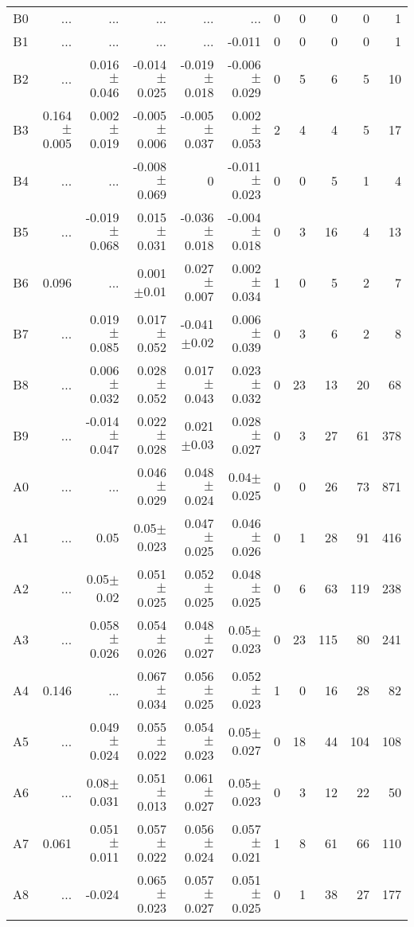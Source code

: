 \begin{table}[t]
\begin{table}[t]
\begin{center}
\begin{tabular}{c|rrrrr|rrrrr}
    B0	&	 ...	&	 ...	&	 ...	&	 ...	&	 ...	&	0	&	0	&	0	&	0	&	1	\\
    B1	&	 ...	&	 ...	&	 ...	&	 ...	&	-0.011	&	0	&	0	&	0	&	0	&	1	\\
    B2	&	 ...	&	0.016$\pm$0.046	&	-0.014$\pm$0.025	&	-0.019$\pm$0.018	&	-0.006$\pm$0.029	&	0	&	5	&	6	&	5	&	10	\\
    B3	&	0.164$\pm$0.005	&	0.002$\pm$0.019	&	-0.005$\pm$0.006	&	-0.005$\pm$0.037	&	0.002$\pm$0.053	&	2	&	4	&	4	&	5	&	17	\\
    B4	&	 ...	&	 ...	&	-0.008$\pm$0.069	&	0	&	-0.011$\pm$0.023	&	0	&	0	&	5	&	1	&	4	\\
    B5	&	 ...	&	-0.019$\pm$0.068	&	0.015$\pm$0.031	&	-0.036$\pm$0.018	&	-0.004$\pm$0.018	&	0	&	3	&	16	&	4	&	13	\\
    B6	&	0.096	&	 ...	&	0.001$\pm$0.01	&	0.027$\pm$0.007	&	0.002$\pm$0.034	&	1	&	0	&	5	&	2	&	7	\\
    B7	&	 ...	&	0.019$\pm$0.085	&	0.017$\pm$0.052	&	-0.041$\pm$0.02	&	0.006$\pm$0.039	&	0	&	3	&	6	&	2	&	8	\\
    B8	&	 ...	&	0.006$\pm$0.032	&	0.028$\pm$0.052	&	0.017$\pm$0.043	&	0.023$\pm$0.032	&	0	&	23	&	13	&	20	&	68	\\
    B9	&	 ...	&	-0.014$\pm$0.047	&	0.022$\pm$0.028	&	0.021$\pm$0.03	&	0.028$\pm$0.027	&	0	&	3	&	27	&	61	&	378	\\
    A0	&	 ...	&	 ...	&	0.046$\pm$0.029	&	0.048$\pm$0.024	&	0.04$\pm$0.025	&	0	&	0	&	26	&	73	&	871	\\
    A1	&	 ...	&	0.05	&	0.05$\pm$0.023	&	0.047$\pm$0.025	&	0.046$\pm$0.026	&	0	&	1	&	28	&	91	&	416	\\
    A2	&	 ...	&	0.05$\pm$0.02	&	0.051$\pm$0.025	&	0.052$\pm$0.025	&	0.048$\pm$0.025	&	0	&	6	&	63	&	119	&	238	\\
    A3	&	 ...	&	0.058$\pm$0.026	&	0.054$\pm$0.026	&	0.048$\pm$0.027	&	0.05$\pm$0.023	&	0	&	23	&	115	&	80	&	241	\\
    A4	&	0.146	&	 ...	&	0.067$\pm$0.034	&	0.056$\pm$0.025	&	0.052$\pm$0.023	&	1	&	0	&	16	&	28	&	82	\\
    A5	&	 ...	&	0.049$\pm$0.024	&	0.055$\pm$0.022	&	0.054$\pm$0.023	&	0.05$\pm$0.027	&	0	&	18	&	44	&	104	&	108	\\
    A6	&	 ...	&	0.08$\pm$0.031	&	0.051$\pm$0.013	&	0.061$\pm$0.027	&	0.05$\pm$0.023	&	0	&	3	&	12	&	22	&	50	\\
    A7	&	0.061	&	0.051$\pm$0.011	&	0.057$\pm$0.022	&	0.056$\pm$0.024	&	0.057$\pm$0.021	&	1	&	8	&	61	&	66	&	110	\\
    A8	&	 ...	&	-0.024	&	0.065$\pm$0.023	&	0.057$\pm$0.027	&	0.051$\pm$0.025	&	0	&	1	&	38	&	27	&	177	\\

\end{tabular}
\end{center}
\end{table}
\end{table}
